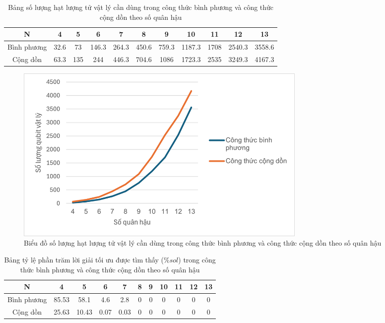 \begin{table}[H]
	\centering
	\begin{tabular}{|c|c|c|c|c|c|c|c|c|c|c|}
		\hline
		N & 4 & 5 & 6 & 7 & 8 & 9 & 10 & 11 & 12 & 13 \\
		\hline
		Bình phương & 32.{6} & 73 & 146.{3} & 264.{3} & 450.{6} & 759.{3} & 1187.{3} & 1708 & 2540.{3} & 3558.{6} \\
		\hline
		Cộng dồn & 63.{3} & 135 & 244 & 446.{3} & 704.{6} & 1086 & 1723.{3} & 2535 & 3249.{3} & 4167.{3} \\
		\hline
	\end{tabular}
	\caption{Bảng số lượng hạt lượng tử vật lý cần dùng trong công thức bình phương và công thức cộng dồn theo số quân hậu}
	\label{tab:num_qubit}
\end{table}

\begin{figure}[H]
	\centering
	\includegraphics[width=0.7\textwidth]{images/methods/num_qubit.png}
	\caption{Biểu đồ số lượng hạt lượng tử vật lý cần dùng trong công thức bình phương và công thức cộng dồn theo số quân hậu}
	\label{fig:num_qubit}
\end{figure}


\begin{table}[H]
	\centering
	\begin{tabular}{|c|c|c|c|c|c|c|c|c|c|c|}
		\hline
		N & 4 & 5 & 6 & 7 & 8 & 9 & 10 & 11 & 12 & 13 \\
		\hline
		Bình phương & 85.53 & 58.1 & 4.6 & 2.8 & 0 & 0 & 0 & 0 & 0 & 0 \\
		\hline
		Cộng dồn & 25.63 & 10.43 & 0.07 & 0.03 & 0 & 0 & 0 & 0 & 0 & 0 \\
		\hline
	\end{tabular}
	
	\caption{Bảng tỷ lệ phần trăm lời giải tối ưu được tìm thấy ($\%sol$) trong công thức bình phương và công thức cộng dồn theo số quân hậu}
	\label{tab:methods/sol}
\end{table}

